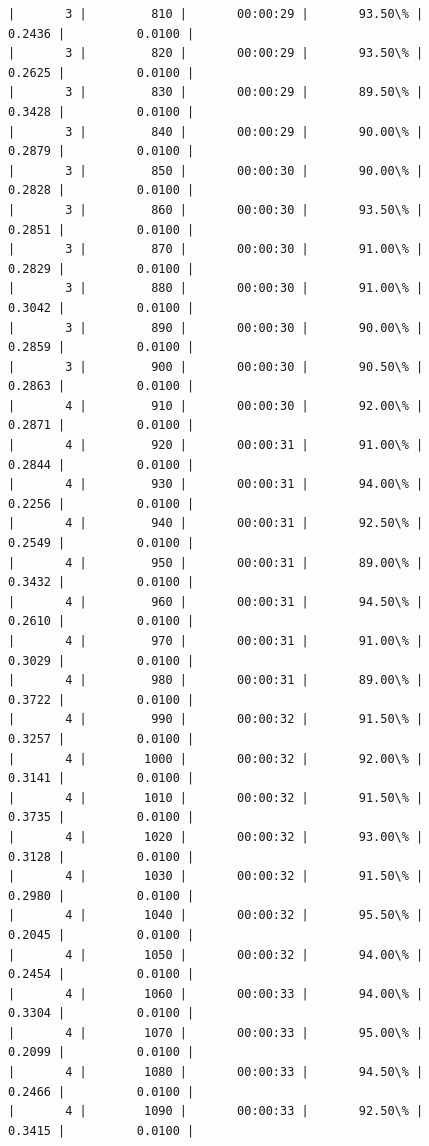 \documentclass[11pt]{article}
\begin{document}
\begin{Verbatim}[commandchars=\\\{\}]
|       3 |         810 |       00:00:29 |       93.50\% |       0.2436 |          0.0100 |
|       3 |         820 |       00:00:29 |       93.50\% |       0.2625 |          0.0100 |
|       3 |         830 |       00:00:29 |       89.50\% |       0.3428 |          0.0100 |
|       3 |         840 |       00:00:29 |       90.00\% |       0.2879 |          0.0100 |
|       3 |         850 |       00:00:30 |       90.00\% |       0.2828 |          0.0100 |
|       3 |         860 |       00:00:30 |       93.50\% |       0.2851 |          0.0100 |
|       3 |         870 |       00:00:30 |       91.00\% |       0.2829 |          0.0100 |
|       3 |         880 |       00:00:30 |       91.00\% |       0.3042 |          0.0100 |
|       3 |         890 |       00:00:30 |       90.00\% |       0.2859 |          0.0100 |
|       3 |         900 |       00:00:30 |       90.50\% |       0.2863 |          0.0100 |
|       4 |         910 |       00:00:30 |       92.00\% |       0.2871 |          0.0100 |
|       4 |         920 |       00:00:31 |       91.00\% |       0.2844 |          0.0100 |
|       4 |         930 |       00:00:31 |       94.00\% |       0.2256 |          0.0100 |
|       4 |         940 |       00:00:31 |       92.50\% |       0.2549 |          0.0100 |
|       4 |         950 |       00:00:31 |       89.00\% |       0.3432 |          0.0100 |
|       4 |         960 |       00:00:31 |       94.50\% |       0.2610 |          0.0100 |
|       4 |         970 |       00:00:31 |       91.00\% |       0.3029 |          0.0100 |
|       4 |         980 |       00:00:31 |       89.00\% |       0.3722 |          0.0100 |
|       4 |         990 |       00:00:32 |       91.50\% |       0.3257 |          0.0100 |
|       4 |        1000 |       00:00:32 |       92.00\% |       0.3141 |          0.0100 |
|       4 |        1010 |       00:00:32 |       91.50\% |       0.3735 |          0.0100 |
|       4 |        1020 |       00:00:32 |       93.00\% |       0.3128 |          0.0100 |
|       4 |        1030 |       00:00:32 |       91.50\% |       0.2980 |          0.0100 |
|       4 |        1040 |       00:00:32 |       95.50\% |       0.2045 |          0.0100 |
|       4 |        1050 |       00:00:32 |       94.00\% |       0.2454 |          0.0100 |
|       4 |        1060 |       00:00:33 |       94.00\% |       0.3304 |          0.0100 |
|       4 |        1070 |       00:00:33 |       95.00\% |       0.2099 |          0.0100 |
|       4 |        1080 |       00:00:33 |       94.50\% |       0.2466 |          0.0100 |
|       4 |        1090 |       00:00:33 |       92.50\% |       0.3415 |          0.0100 |

\end{Verbatim}
\end{document}
